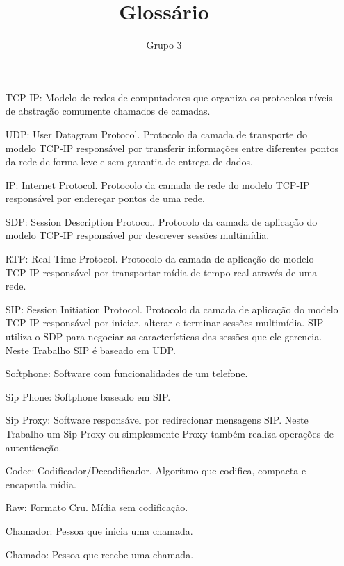 \documentclass[12pt,a4paper]{article}
\author{Grupo 3}
\title{Gloss\'{a}rio}
\begin{document}
\maketitle

\begin{enumerate}
\item [TCP-IP:] Modelo de redes de computadores que organiza os protocolos n\'{i}veis de abstra\c{c}\~{a}o comumente chamados de camadas.

\item [UDP:] User Datagram Protocol. Protocolo da camada de transporte do modelo TCP-IP respons\'{a}vel por transferir informa\c{c}\~{o}es entre diferentes pontos da rede de forma leve e sem garantia de entrega de dados.

\item [IP:] Internet Protocol. Protocolo da camada de rede do modelo TCP-IP respons\'{a}vel por endere\c{c}ar pontos de uma rede.

\item [SDP:] Session Description Protocol. Protocolo da camada de aplica\c{c}\~{a}o do modelo TCP-IP respons\'{a}vel por descrever sess\~{o}es multim\'{i}dia.

\item [RTP:] Real Time Protocol. Protocolo da camada de aplica\c{c}\~{a}o do modelo TCP-IP respons\'{a}vel por transportar m\'{i}dia de tempo real através de uma rede.

\item [SIP:] Session Initiation Protocol. Protocolo da camada de aplica\c{c}\~{a}o do modelo TCP-IP respons\'{a}vel por iniciar, alterar e terminar sess\~{o}es multim\'{i}dia. SIP utiliza o SDP para negociar as caracter\'{i}sticas das sess\~{o}es que ele gerencia. Neste Trabalho SIP é baseado em UDP.

\item [Softphone:] Software com funcionalidades de um telefone.

\item [Sip Phone:] Softphone baseado em SIP.

\item [Sip Proxy:] Software respons\'{a}vel por redirecionar mensagens SIP. Neste Trabalho um Sip Proxy ou simplesmente Proxy tamb\'{e}m realiza opera\c{c}\~{o}es de autentica\c{c}\~{a}o.

\item [Codec:] Codificador/Decodificador. Algor\'{i}tmo que codifica, compacta e encapsula mídia.

\item [Raw:] Formato Cru. M\'{i}dia sem codifica\c{c}\~{a}o.

\item [Chamador:] Pessoa que inicia uma chamada.

\item [Chamado:] Pessoa que recebe uma chamada.

\end{enumerate}
\end{document}
